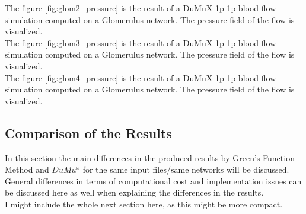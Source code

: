 The figure \ref{fig:glom2_pressure} is the result of a DuMuX 1p-1p blood flow simulation computed on a Glomerulus network. The pressure field of the flow is visualized.\\

The figure \ref{fig:glom3_pressure} is the result of a DuMuX 1p-1p blood flow simulation computed on a Glomerulus network. The pressure field of the flow is visualized.\\

The figure \ref{fig:glom4_pressure} is the result of a DuMuX 1p-1p blood flow simulation computed on a Glomerulus network. The pressure field of the flow is visualized.\\

\newpage
\subsection{Comparison of the Results}
In this section the main differences in the produced results by Green's Function Method and $DuMu^x$ for the same input files/same networks will be discussed.
\\General differences in terms of computational cost and implementation issues can be discussed here as well when explaining the differences in the results.
\\I might include the whole next section here, as this might be more compact.


